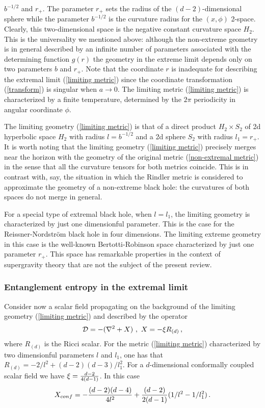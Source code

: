 \documentclass[12pt]{article}
\def\be{\begin{eqnarray}}
\def\ee{\end{eqnarray}}
\def\lb{\label}
\def\o{\over}
\begin{document}
$b^{-1/2}$ and $r_+$.
The parameter $r_+$ sets the radius of the $(d-2)$-dimensional sphere while
the parameter $b^{-1/2}$ is the curvature radius
 for the $(x,\phi)$ 2-space. Clearly, this two-dimensional space is the negative constant curvature space $H_2$.
This is the universality we mentioned above: although the non-extreme geometry
is in general described by an infinite number of parameters associated with the
determining function  $g(r)$ the geometry in the extreme limit 
depends only on two parameters ${b}$ and $r_+$. 
Note that the coordinate $r$ is inadequate for describing the
extremal limit (\ref{limiting metric}) since the coordinate transformation (\ref{transform})
is singular when $a\rightarrow 0$. The limiting metric (\ref{limiting metric}) is characterized by a finite temperature, determined by the $2\pi$ 
periodicity in angular coordinate $\phi$.


The limiting geometry (\ref{limiting metric})
is that of a direct product $H_2\times S_2$ of 2d hyperbolic space $H_2$ with
radius $l=b^{-1/2}$ and a 2d sphere $S_2$ with radius $l_1=r_+$.
It is worth noting that the limiting geometry
(\ref{limiting metric})  precisely merges near the horizon with the
geometry of the original metric (\ref{non-extremal metric}) in the sense that all the 
curvature tensors for both metrics coincide.
This is in contrast with, say, the situation in which the Rindler metric is considered
to approximate the geometry of a non-extreme black hole:
the curvatures of both spaces do not merge in general.

For a special type of extremal black hole, when  $l=l_1$,  the limiting geometry is characterized by just one dimensionful parameter. This is the case for   the Reissner-Nordstr\"{o}m black hole in four dimensions. The limiting 
extreme geometry in this case  is the well-known 
Bertotti-Robinson space characterized by just one parameter $r_+$.
This space has remarkable properties in the context of supergravity theory that are not the subject of
the present review.

\subsubsection{Entanglement entropy in the extremal limit}
\label{section: entropy in the extremal limit}

Consider now a scalar field propagating on the background of the limiting geometry (\ref{limiting metric}) and described by the operator
\be
{\cal D}=-(\nabla^2+X)\, \, , \ X=-\xi R_{(d)} \, ,
\lb{field operator}
\ee
where $R_{(d)}$ is the Ricci scalar. For the metric (\ref{limiting metric}) characterized by two dimensionful parameters $l$ and $l_1$, one has that $R_{(d)}=-2/l^2+(d-2)(d-3)/l_1^2$.  For a $d$-dimensional conformally coupled scalar field we have $\xi={d-2\o 4(d-1)}$. In this case
\be
X_{conf}=-{(d-2)(d-4)\o 4l^2}+{(d-2)\o 2(d-1)}(1/l^2-1/l_1^2)\, .
\lb{E conf}
\ee
\end{document}
